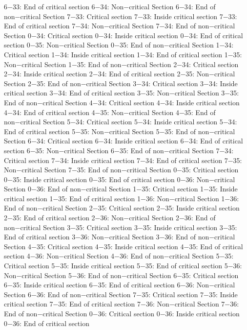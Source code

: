 6−33: End of critical section
6−34: Non−critical Section
6−34: End of non−critical Section
7−33: Critical section
7−33: Inside critical section
7−33: End of critical section
7−34: Non−critical Section
7−34: End of non−critical Section
0−34: Critical section
0−34: Inside critical section
0−34: End of critical section
0−35: Non−critical Section
0−35: End of non−critical Section
1−34: Critical section
1−34: Inside critical section
1−34: End of critical section
1−35: Non−critical Section
1−35: End of non−critical Section
2−34: Critical section
2−34: Inside critical section
2−34: End of critical section
2−35: Non−critical Section
2−35: End of non−critical Section
3−34: Critical section
3−34: Inside critical section
3−34: End of critical section
3−35: Non−critical Section
3−35: End of non−critical Section
4−34: Critical section
4−34: Inside critical section
4−34: End of critical section
4−35: Non−critical Section
4−35: End of non−critical Section
5−34: Critical section
5−34: Inside critical section
5−34: End of critical section
5−35: Non−critical Section
5−35: End of non−critical Section
6−34: Critical section
6−34: Inside critical section
6−34: End of critical section
6−35: Non−critical Section
6−35: End of non−critical Section
7−34: Critical section
7−34: Inside critical section
7−34: End of critical section
7−35: Non−critical Section
7−35: End of non−critical Section
0−35: Critical section
0−35: Inside critical section
0−35: End of critical section
0−36: Non−critical Section
0−36: End of non−critical Section
1−35: Critical section
1−35: Inside critical section
1−35: End of critical section
1−36: Non−critical Section
1−36: End of non−critical Section
2−35: Critical section
2−35: Inside critical section
2−35: End of critical section
2−36: Non−critical Section
2−36: End of non−critical Section
3−35: Critical section
3−35: Inside critical section
3−35: End of critical section
3−36: Non−critical Section
3−36: End of non−critical Section
4−35: Critical section
4−35: Inside critical section
4−35: End of critical section
4−36: Non−critical Section
4−36: End of non−critical Section
5−35: Critical section
5−35: Inside critical section
5−35: End of critical section
5−36: Non−critical Section
5−36: End of non−critical Section
6−35: Critical section
6−35: Inside critical section
6−35: End of critical section
6−36: Non−critical Section
6−36: End of non−critical Section
7−35: Critical section
7−35: Inside critical section
7−35: End of critical section
7−36: Non−critical Section
7−36: End of non−critical Section
0−36: Critical section
0−36: Inside critical section
0−36: End of critical section
